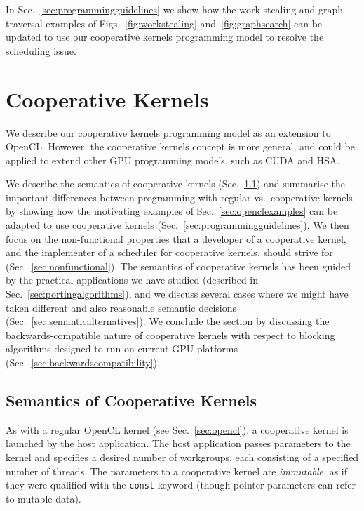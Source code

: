 \documentclass[numbers,nocopyrightspace,10pt]{sigplanconf}
\newcommand{\myfigs}{Figs.~}
\newcommand{\mysec}{Sec.~}
\begin{document}
In \mysec\ref{sec:programmingguidelines} we show how the work stealing
and graph traversal examples of \myfigs\ref{fig:workstealing} and~\ref{fig:graphsearch} can be
updated to use our cooperative kernels programming model to resolve
the scheduling issue.





\section{Cooperative Kernels}\label{sec:cooperativekernels}

We describe our cooperative kernels programming model as an extension
to OpenCL.  However, the cooperative kernels concept is more general,
and could be applied to extend other GPU programming models, such as
CUDA and HSA.

We describe the semantics of cooperative kernels
(\mysec\ref{sec:semantics}) and summarise the important
differences between programming with regular vs.\ cooperative kernels
by showing how the motivating examples of \mysec\ref{sec:openclexamples} can be adapted to use cooperative kernels
(\mysec\ref{sec:programmingguidelines}).
We then focus on the non-functional
properties that a developer of a cooperative kernel, and the
implementer of a scheduler for cooperative kernels, should strive for
(\mysec\ref{sec:nonfunctional}).  The semantics of cooperative
kernels has been guided by the practical applications we have studied
(described in \mysec\ref{sec:portingalgorithms}), and we discuss several cases where we
might have taken different and also reasonable semantic decisions (\mysec\ref{sec:semanticalternatives}).
We conclude the section by discussing the backwards-compatible nature
of cooperative kernels with respect to blocking algorithms designed to
run on current GPU platforms
(\mysec\ref{sec:backwardscompatibility}).

\subsection{Semantics of Cooperative Kernels}\label{sec:semantics}

As with a regular OpenCL kernel (see \mysec\ref{sec:opencl}), a
cooperative kernel is launched by the host application.  The host
application passes parameters to the kernel and specifies a desired
number of workgroups, each consisting of a specified number of
threads.  The parameters to a cooperative kernel are \emph{immutable}, as if
they were qualified with the \texttt{const} keyword (though pointer
parameters can refer to mutable data).
\end{document}
